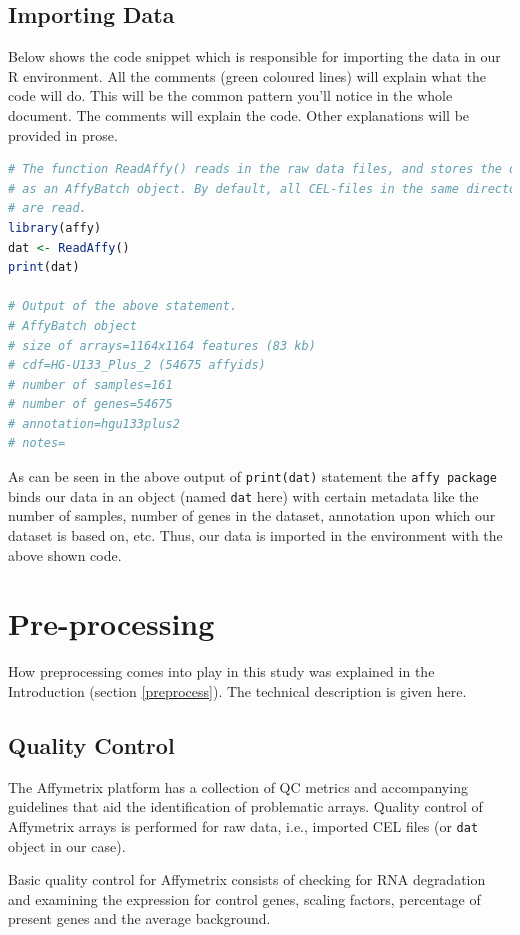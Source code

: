 \documentclass[oneside, a4paper, 11pt]{book}
\begin{document}
\subsection{Importing Data}
Below shows the code snippet which is responsible for importing the data in our R environment. All the comments (green coloured lines) will explain what the code will do. This will be the common pattern you'll notice in the whole document. The comments will explain the code. Other explanations will be provided in prose.

\begin{lstlisting}[language=R, caption=Data Importing]
# The function ReadAffy() reads in the raw data files, and stores the data
# as an AffyBatch object. By default, all CEL-files in the same directory
# are read.
library(affy)
dat <- ReadAffy()
print(dat)

# Output of the above statement.
# AffyBatch object
# size of arrays=1164x1164 features (83 kb)
# cdf=HG-U133_Plus_2 (54675 affyids)
# number of samples=161
# number of genes=54675
# annotation=hgu133plus2
# notes=
\end{lstlisting}

As can be seen in the above output of \texttt{print(dat)} statement the \texttt{affy package} binds our data in an object (named \texttt{dat} here) with certain metadata like the number of samples, number of genes in the dataset, annotation upon which our dataset is based on, etc. Thus, our data is imported in the environment with the above shown code.

\section{Pre-processing}
How preprocessing comes into play in this study was explained in the Introduction (section \ref{preprocess}). The technical description is given here.

\subsection{Quality Control}
The Affymetrix platform has a collection of QC metrics and accompanying guidelines that aid the identification of problematic arrays. Quality control of Affymetrix arrays is performed for raw data, i.e., imported CEL files (or \texttt{dat} object in our case).

Basic quality control for Affymetrix consists of checking for RNA degradation and examining the expression for control genes, scaling factors, percentage of present genes and the average background.
\end{document}
